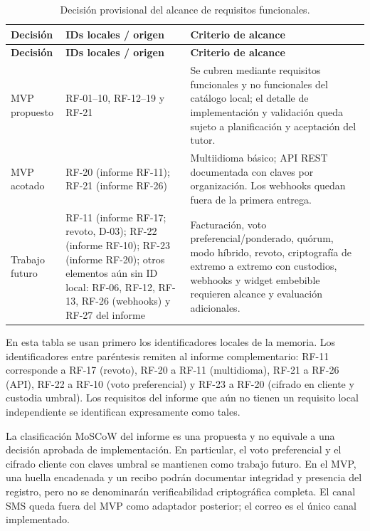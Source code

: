 \small
\begin{longtable}{|p{}|p{}|p{}|}
\caption{Decisión provisional del alcance de requisitos funcionales.}\label{tab:alcance-mvp}\\
\hline
\textbf{Decisión} & \textbf{IDs locales / origen} & \textbf{Criterio de alcance} \\
\hline
\endfirsthead
\hline
\textbf{Decisión} & \textbf{IDs locales / origen} & \textbf{Criterio de alcance} \\
\hline
\endhead
\hline
\endfoot
\hline
\endlastfoot
MVP propuesto & RF-01--10, RF-12--19 y RF-21 & Se cubren mediante requisitos funcionales y no funcionales del catálogo local; el detalle de implementación y validación queda sujeto a planificación y aceptación del tutor. \\
\hline
MVP acotado & RF-20 (informe RF-11); RF-21 (informe RF-26) & Multiidioma básico; API REST documentada con claves por organización. Los webhooks quedan fuera de la primera entrega. \\
\hline
Trabajo futuro & RF-11 (informe RF-17; revoto, D-03); RF-22 (informe RF-10); RF-23 (informe RF-20); otros elementos aún sin ID local: RF-06, RF-12, RF-13, RF-26 (webhooks) y RF-27 del informe & Facturación, voto preferencial/ponderado, quórum, modo híbrido, revoto, criptografía de extremo a extremo con custodios, webhooks y widget embebible requieren alcance y evaluación adicionales. \\
\hline
\end{longtable}
\normalsize

En esta tabla se usan primero los identificadores locales de la memoria. Los
identificadores entre paréntesis remiten al informe complementario: RF-11
corresponde a RF-17 (revoto), RF-20 a RF-11 (multidioma), RF-21 a RF-26 (API), RF-22 a RF-10 (voto
preferencial) y RF-23 a RF-20 (cifrado en cliente y custodia umbral). Los
requisitos del informe que aún no tienen un requisito local independiente se
identifican expresamente como tales.

La clasificación MoSCoW del informe es una propuesta y no equivale a una
decisión aprobada de implementación. En particular, el voto preferencial y el
cifrado cliente con claves umbral se mantienen como trabajo futuro. En el MVP,
una huella encadenada y un recibo podrán documentar integridad y presencia del
registro, pero no se denominarán verificabilidad criptográfica completa.
El canal SMS queda fuera del MVP como adaptador posterior; el correo es el
único canal implementado.
